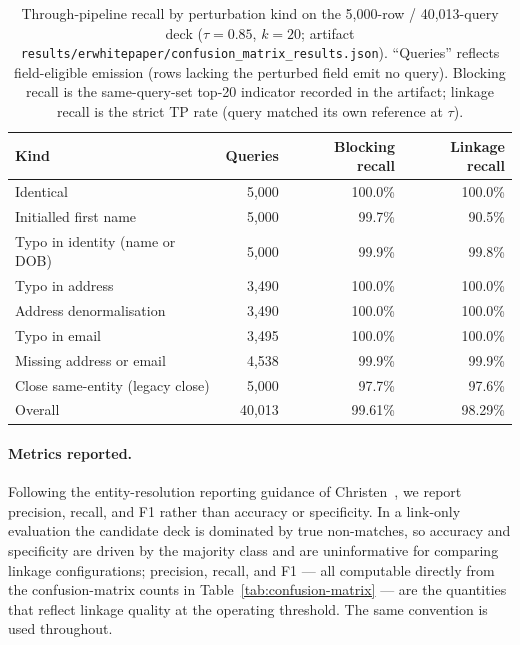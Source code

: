 \documentclass[11pt]{article}
\begin{document}
\begin{table}[h]
\centering
\caption{Through-pipeline recall by perturbation kind on the 5,000-row / 40,013-query deck ($\tau=0.85$, $k=20$; artifact \texttt{results/erwhitepaper/confusion\_matrix\_results.json}). ``Queries'' reflects field-eligible emission (rows lacking the perturbed field emit no query). Blocking recall is the same-query-set top-20 indicator recorded in the artifact; linkage recall is the strict TP rate (query matched its own reference at $\tau$).}
\label{tab:per-kind-confusion}
\small
\begin{tabular}{lrrr}
\toprule
Kind & Queries & Blocking recall & Linkage recall \\
\midrule
Identical & 5,000 & 100.0\% & 100.0\% \\
Initialled first name & 5,000 & 99.7\% & 90.5\% \\
Typo in identity (name or DOB) & 5,000 & 99.9\% & 99.8\% \\
Typo in address & 3,490 & 100.0\% & 100.0\% \\
Address denormalisation & 3,490 & 100.0\% & 100.0\% \\
Typo in email & 3,495 & 100.0\% & 100.0\% \\
Missing address or email & 4,538 & 99.9\% & 99.9\% \\
Close same-entity (legacy close) & 5,000 & 97.7\% & 97.6\% \\
\midrule
Overall & 40,013 & 99.61\% & 98.29\% \\
\bottomrule
\end{tabular}
\end{table}

\paragraph{Metrics reported.} Following the entity-resolution reporting guidance of Christen~\cite{christen2012}, we report precision, recall, and F1 rather than accuracy or specificity. In a link-only evaluation the candidate deck is dominated by true non-matches, so accuracy and specificity are driven by the majority class and are uninformative for comparing linkage configurations; precision, recall, and F1 --- all computable directly from the confusion-matrix counts in Table~\ref{tab:confusion-matrix} --- are the quantities that reflect linkage quality at the operating threshold. The same convention is used throughout.
\end{document}
